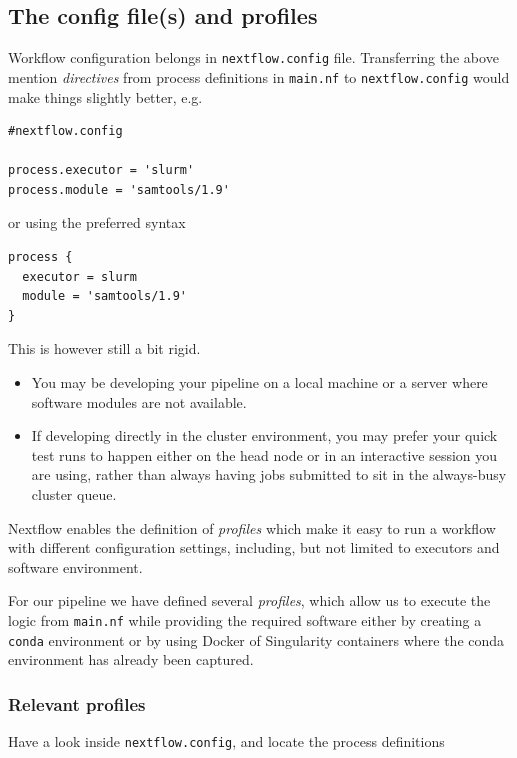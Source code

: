 \subsection{The config file(s) and profiles}

Workflow configuration belongs in \texttt{nextflow.config} file. 
Transferring the above mention \emph{directives} from process definitions in \texttt{main.nf} 
to \texttt{nextflow.config} would make things slightly better, e.g.

\begin{lstlisting}
#nextflow.config

process.executor = 'slurm' 
process.module = 'samtools/1.9' 
\end{lstlisting}

or using the preferred syntax

\begin{lstlisting}
process {
  executor = slurm
  module = 'samtools/1.9'
}
\end{lstlisting}


This is however still a bit rigid. 
\begin{itemize}
\item You may be developing your pipeline on a local machine or a server where software modules are not available. 
\item If developing directly in the cluster environment, you may prefer your quick test runs to happen either on the head node or in an interactive session you are using, rather than always having jobs submitted to sit in the always-busy cluster queue.
\end{itemize}

Nextflow enables the definition of \emph{profiles} which make it easy to run a workflow 
with different configuration settings, including, but not limited to executors and software environment.

For our pipeline we have defined several \emph{profiles}, which allow us to execute the logic from \texttt{main.nf} while providing the required software either by creating a \texttt{conda} environment or by using Docker of Singularity containers where the conda environment has already been captured. 

\subsubsection{Relevant profiles}


Have a look inside \texttt{nextflow.config}, and locate the process definitions

